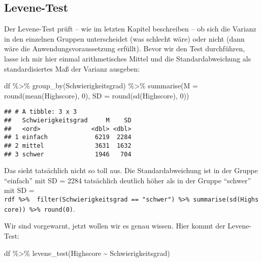 \documentclass[
]{book}
\newenvironment{Shaded}{\begin{snugshade}}{\end{snugshade}}
\newcommand{\AttributeTok}[1]{\textcolor[rgb]{0.77,0.63,0.00}{#1}}
\newcommand{\DecValTok}[1]{\textcolor[rgb]{0.00,0.00,0.81}{#1}}
\newcommand{\FunctionTok}[1]{\textcolor[rgb]{0.00,0.00,0.00}{#1}}
\newcommand{\NormalTok}[1]{#1}
\newcommand{\SpecialCharTok}[1]{\textcolor[rgb]{0.00,0.00,0.00}{#1}}
\begin{document}
\hypertarget{levene-test}{%
\subsection{Levene-Test}\label{levene-test}}

Der Levene-Test prüft -- wie im letzten Kapitel beschreiben -- ob sich die Varianz in den einzelnen Gruppen unterscheidet (was schlecht wäre) oder nicht (dann wäre die Anwendungsvoraussetzung erfüllt). Bevor wir den Test durchführen, lasse ich mir hier einmal arithmetisches Mittel und die Standardabweichung als standardisiertes Maß der Varianz ausgeben:

\begin{Shaded}
\begin{Highlighting}[]
\NormalTok{df }\SpecialCharTok{\%\textgreater{}\%} 
  \FunctionTok{group\_by}\NormalTok{(Schwierigkeitsgrad) }\SpecialCharTok{\%\textgreater{}\%} 
  \FunctionTok{summarise}\NormalTok{(}\AttributeTok{M =} \FunctionTok{round}\NormalTok{(}\FunctionTok{mean}\NormalTok{(Highscore), }\DecValTok{0}\NormalTok{), }\AttributeTok{SD =} \FunctionTok{round}\NormalTok{(}\FunctionTok{sd}\NormalTok{(Highscore), }\DecValTok{0}\NormalTok{)) }
\end{Highlighting}
\end{Shaded}

\begin{verbatim}
## # A tibble: 3 x 3
##   Schwierigkeitsgrad     M    SD
##   <ord>              <dbl> <dbl>
## 1 einfach             6219  2284
## 2 mittel              3631  1632
## 3 schwer              1946   704
\end{verbatim}

Das sieht tatsächlich nicht so toll aus. Die Standardabweichung ist in der Gruppe ``einfach'' mit SD = 2284 tatsächlich deutlich höher als in der Gruppe ``schwer'' mit SD = \texttt{rdf\ \%\textgreater{}\%\ \ filter(Schwierigkeitsgrad\ ==\ "schwer")\ \%\textgreater{}\%\ summarise(sd(Highscore))\ \%\textgreater{}\%\ round(0)}.

Wir sind vorgewarnt, jetzt wollen wir es genau wissen. Hier kommt der Levene-Test:

\begin{Shaded}
\begin{Highlighting}[]
\NormalTok{df }\SpecialCharTok{\%\textgreater{}\%} 
  \FunctionTok{levene\_test}\NormalTok{(Highscore }\SpecialCharTok{\textasciitilde{}}\NormalTok{ Schwierigkeitsgrad)}
\end{Highlighting}
\end{Shaded}
\end{document}
